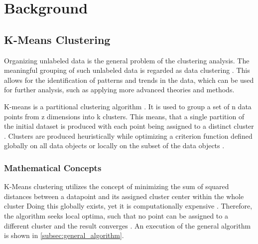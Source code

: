 \section{Background}
\label{cha:background}






%

\subsection{K-Means Clustering}
\label{sec:k_means_clustering}
Organizing unlabeled data \cite{EZU-CPF} is the general problem of the clustering analysis.
The meaningful grouping of such unlabeled data is regarded as data clustering \cite{ABI-RKC}.
This allows for the identification of patterns and trends in the data, which can be used for further analysis, such as applying more advanced theories and methods.

K-means is a partitional clustering algorithm \cite{SIN-UKC}.
It is used to group a set of n data points from z dimensions into k clusters.
This means, that a single partition of the initial dataset is produced with each point being assigned to a distinct cluster \cite{SIN-UKC}.
Clusters are produced heuristically while optimizing a criterion function defined globally on all data objects or locally on the subset of the data objects \cite{ZHU-EPC}.

\subsubsection{Mathematical Concepts}
K-Means clustering utilizes the concept of minimizing the sum of squared distances between a datapoint and its assigned cluster center within the whole cluster \cite{HAR-KMA}
Doing this globally exists, yet it is computationally expensive \cite{LIS-GKC}.
Therefore, the algorithm seeks local optima, such that no point can be assigned to a different cluster and the result converges \cite{SEL-GCT}.
An execution of the general algorithm is shown in \ref{subsec:general_algorithm}.

